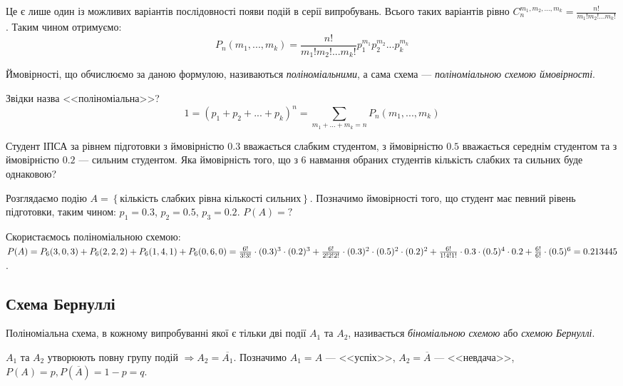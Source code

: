Це є лише один із можливих варіантів послідовності появи подій в серії випробувань. Всього таких варіантів 
рівно $C_n^{m_1, m_2, ..., m_k} = \frac{n!}{m_1!m_2! ... m_k!}$. Таким чином отримуємо:
\begin{equation}
    P_n(m_1, ..., m_k) = \frac{n!}{m_1!m_2! ... m_k!} p_1^{m_1} p_2^{m_2} ... p_k^{m_k}
\end{equation}
\begin{definition}
    Ймовірності, що обчислюємо за даною формулою, називаються \emph{поліноміальними}, а 
    сама схема --- \emph{поліноміальною схемою ймовірності}. 
\end{definition}
\begin{remark} Звідки назва <<поліноміальна>>?
    $$1 = (p_1 + p_2 + ... + p_k)^n = \sum_{m_1 + ... + m_k = n} P_n(m_1, ..., m_k)$$
\end{remark}
\begin{example}
    Студент ІПСА за рівнем підготовки з ймовірністю $0.3$ вважається слабким студентом, 
    з ймовірністю $0.5$ вважається середнім студентом та 
    з ймовірністю $0.2$ --- сильним студентом. Яка ймовірність того, що з 6 навмання 
    обраних студентів кількість слабких та сильних буде однаковою?

    Розглядаємо подію $A = \left\{\text{кількість слабких рівна кількості сильних}\right\}$. 
    Позначимо ймовірності того, що студент має певний рівень підготовки, таким чином:
    $p_1 = 0.3$, $p_2 = 0.5$, $p_3 = 0.2$.
    $P(A)=\text{?}$

    Скористаємось поліноміальною схемою:
    $P(A) = P_6(3, 0, 3) + P_6(2, 2, 2) + P_6(1, 4, 1) + \\ P_6(0, 6, 0) = 
    \frac{6!}{3!3!}\cdot(0.3)^3 \cdot(0.2)^3 + \frac{6!}{2!2!2!}\cdot(0.3)^2 \cdot(0.5)^2 \cdot(0.2)^2 + 
    \frac{6!}{1!4!1!}\cdot0.3 \cdot(0.5)^4 \cdot 0.2 + \frac{6!}{6!} \cdot(0.5)^6 = 0.213445$.
\end{example}
\subsection{Схема Бернуллі}
\begin{definition}
    Поліноміальна схема, в кожному випробуванні якої є тільки дві події $A_1$ та $A_2$, 
    називається \emph{біноміальною схемою} або \emph{схемою Бернуллі}.
\end{definition}

$A_1$ та $A_2$ утворюють повну групу подій $\Rightarrow A_2 = \overline{A_1}$.
Позначимо $A_1 = A$ --- <<успіх>>, $A_2 = \overline{A}$ --- <<невдача>>, 
$P(A) = p, P(\overline{A}) = 1-p = q$.

